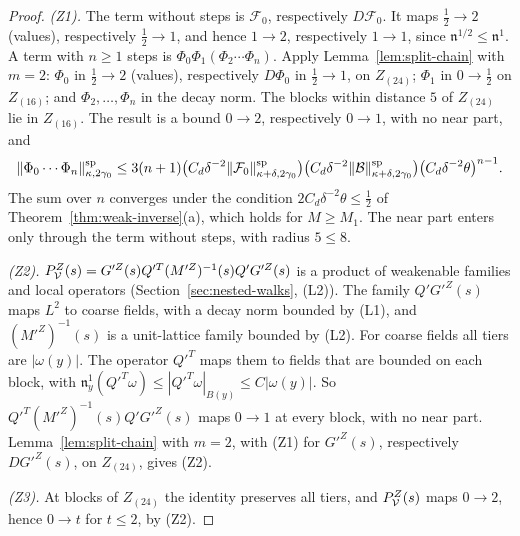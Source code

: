 \begin{proof}
\emph{(Z1).} The term without steps is $\mathcal F_0$, respectively $D\mathcal F_0$. It maps $\frac12\to2$ (values), respectively $\frac12\to1$, and hence $1\to2$, respectively $1\to1$, since $\mathfrak n^{1/2}\le\mathfrak n^1$. A term with $n\ge1$ steps is $\Phi_0\Phi_1(\Phi_2\cdots\Phi_n)$. Apply Lemma~\ref{lem:split-chain} with $m=2$: $\Phi_0$ in $\frac12\to2$ (values), respectively $D\Phi_0$ in $\frac12\to1$, on $Z_{(24)}$; $\Phi_1$ in $0\to\frac12$ on $Z_{(16)}$; and $\Phi_2,\dots,\Phi_n$ in the decay norm. The blocks within distance $5$ of $Z_{(24)}$ lie in $Z_{(16)}$. The result is a bound $0\to2$, respectively $0\to1$, with no near part, and
\[
\|\Phi_0\cdots\Phi_n\|^{\rm sp}_{\kappa,2\gamma_0}\le3(n+1)\big(C_d\delta^{-2}\|\mathcal F_0\|^{\rm sp}_{\kappa+\delta,2\gamma_0}\big)\big(C_d\delta^{-2}\|\mathcal B\|^{\rm sp}_{\kappa+\delta,2\gamma_0}\big)\big(C_d\delta^{-2}\theta\big)^{n-1}.
\]
The sum over $n$ converges under the condition $2C_d\delta^{-2}\theta\le\frac12$ of Theorem~\ref{thm:weak-inverse}(a), which holds for $M\ge M_1$. The near part enters only through the term without steps, with radius $5\le8$.

\emph{(Z2).} $P^Z_\mathcal V(s)=G'^Z(s)Q'^T(M'^Z)^{-1}(s)Q'G'^Z(s)$ is a product of weakenable families and local operators (Section~\ref{sec:nested-walks}, (L2)). The family $Q'G'^Z(s)$ maps $L^2$ to coarse fields, with a decay norm bounded by (L1), and $(M'^Z)^{-1}(s)$ is a unit-lattice family bounded by (L2). For coarse fields all tiers are $|\omega(y)|$. The operator $Q'^T$ maps them to fields that are bounded on each block, with $\mathfrak n^1_y(Q'^T\omega)\le|Q'^T\omega|_{B(y)}\le C|\omega(y)|$. So $Q'^T(M'^Z)^{-1}(s)Q'G'^Z(s)$ maps $0\to1$ at every block, with no near part. Lemma~\ref{lem:split-chain} with $m=2$, with (Z1) for $G'^Z(s)$, respectively $DG'^Z(s)$, on $Z_{(24)}$, gives (Z2).

\emph{(Z3).} At blocks of $Z_{(24)}$ the identity preserves all tiers, and $P^Z_\mathcal V(s)$ maps $0\to2$, hence $0\to t$ for $t\le2$, by (Z2).


\end{proof}
